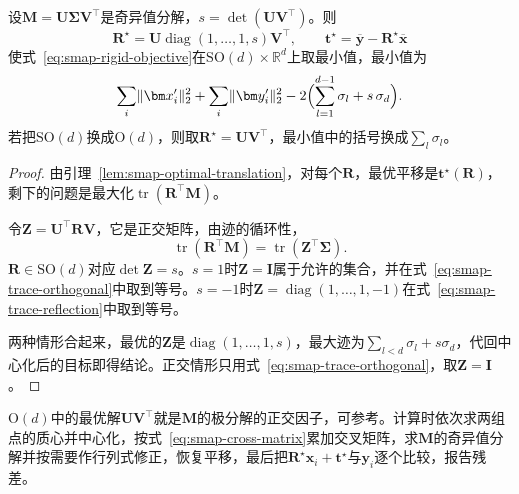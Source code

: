 \begin{theorem}[对应点的刚体估计]
\label{thm:smap-rigid-estimate}
设$\bm M=\bm U\bm\Sigma\bm V^\top$是奇异值分解，$s=\det(\bm U\bm V^\top)$。则
\begin{equation}
 \bm R^\star=\bm U\operatorname{diag}(1,\ldots,1,s)\bm V^\top,\qquad
 \bm t^\star=\overline{\bm y}-\bm R^\star\overline{\bm x}
 \label{eq:smap-rigid-solution}
\end{equation}
使式~\eqref{eq:smap-rigid-objective}在$\mathrm{SO}(d)\times\mathbb R^d$上取最小值，最小值为
\begin{equation}
 \sum_i\lVert\bm x_i'\rVert_2^2+\sum_i\lVert\bm y_i'\rVert_2^2
 -2\Bigl(\sum_{l=1}^{d-1}\sigma_l+s\,\sigma_d\Bigr).
 \label{eq:smap-rigid-minimum}
\end{equation}
若把$\mathrm{SO}(d)$换成$\mathrm O(d)$，则取$\bm R^\star=\bm U\bm V^\top$，最小值中的括号换成$\sum_l\sigma_l$。
\end{theorem}
\begin{proof}
由引理~\ref{lem:smap-optimal-translation}，对每个$\bm R$，最优平移是$\bm t^\star(\bm R)$，剩下的问题是最大化$\operatorname{tr}(\bm R^\top\bm M)$。

令$\bm Z=\bm U^\top\bm R\bm V$，它是正交矩阵，由迹的循环性，
\[
 \operatorname{tr}(\bm R^\top\bm M)=\operatorname{tr}(\bm Z^\top\bm\Sigma) .
\]
$\bm R\in\mathrm{SO}(d)$对应$\det\bm Z=s$。$s=1$时$\bm Z=\bm I$属于允许的集合，并在式~\eqref{eq:smap-trace-orthogonal}中取到等号。$s=-1$时$\bm Z=\operatorname{diag}(1,\ldots,1,-1)$在式~\eqref{eq:smap-trace-reflection}中取到等号。

两种情形合起来，最优的$\bm Z$是$\operatorname{diag}(1,\ldots,1,s)$，最大迹为$\sum_{l<d}\sigma_l+s\sigma_d$，代回中心化后的目标即得结论。正交情形只用式~\eqref{eq:smap-trace-orthogonal}，取$\bm Z=\bm I$。
\end{proof}

$\mathrm O(d)$中的最优解$\bm U\bm V^\top$就是$\bm M$的极分解的正交因子，可参考。计算时依次求两组点的质心并中心化，按式~\eqref{eq:smap-cross-matrix}累加交叉矩阵，求$\bm M$的奇异值分解并按需要作行列式修正，恢复平移，最后把$\bm R^\star\bm x_i+\bm t^\star$与$\bm y_i$逐个比较，报告残差。

